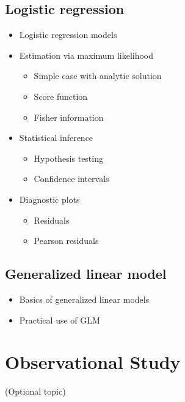 \documentclass[12pt,]{book}
\providecommand{\tightlist}{%
  \setlength{\itemsep}{0pt}\setlength{\parskip}{0pt}}
\begin{document}
\section{Logistic regression}\label{logistic-regression}

\begin{itemize}
\tightlist
\item
  Logistic regression models
\item
  Estimation via maximum likelihood

  \begin{itemize}
  \tightlist
  \item
    Simple case with analytic solution
  \item
    Score function
  \item
    Fisher information
  \end{itemize}
\item
  Statistical inference

  \begin{itemize}
  \tightlist
  \item
    Hypothesis testing
  \item
    Confidence intervals
  \end{itemize}
\item
  Diagnostic plots

  \begin{itemize}
  \tightlist
  \item
    Residuals
  \item
    Pearson residuals
  \end{itemize}
\end{itemize}

\section{Generalized linear model}\label{generalized-linear-model}

\begin{itemize}
\tightlist
\item
  Basics of generalized linear models
\item
  Practical use of GLM
\end{itemize}

\chapter{Observational Study}\label{ch:obs}

(Optional topic)
\end{document}
